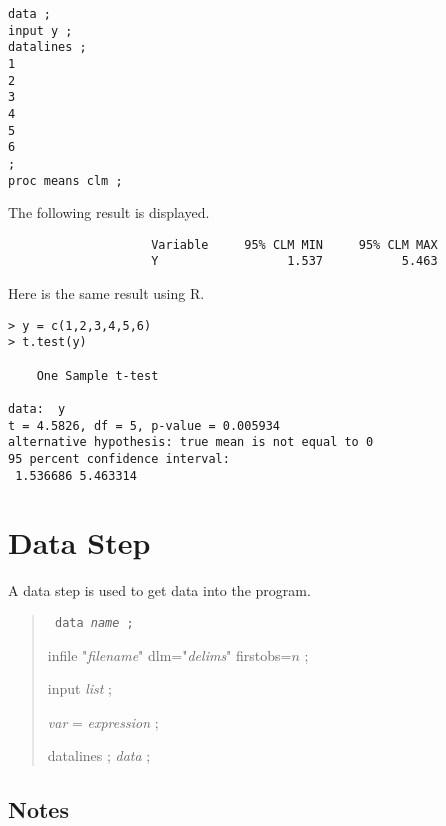 \documentclass[12pt]{article}
\begin{document}
{\scriptsize\begin{verbatim}
data ;
input y ;
datalines ;
1
2
3
4
5
6
;
proc means clm ;
\end{verbatim}}

The following result is displayed.

{\scriptsize\begin{verbatim}
                    Variable     95% CLM MIN     95% CLM MAX
                    Y                  1.537           5.463
\end{verbatim}}

Here is the same result using R.

{\scriptsize\begin{verbatim}
> y = c(1,2,3,4,5,6)
> t.test(y)

	One Sample t-test

data:  y
t = 4.5826, df = 5, p-value = 0.005934
alternative hypothesis: true mean is not equal to 0
95 percent confidence interval:
 1.536686 5.463314
\end{verbatim}}

\newpage

\section{Data Step}
A data step is used to get data into the program.

\begin{quote}
{\tt
data {\it name} ;

infile "{\it filename}" dlm="{\it delims}" firstobs=$n$ ;

input {\it list} ;

{\it var} = {\it expression} ;

datalines ; {\it data} ;
}
\end{quote}

\subsection*{Notes}
\end{document}
